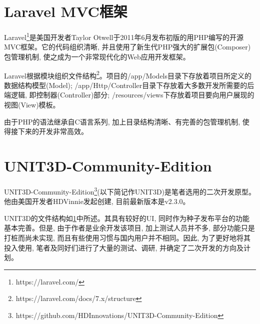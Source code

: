 \section{Laravel MVC框架}
\label{sec:Larvel}

Laravel\footnote{https://laravel.com/}是美国开发者Taylor Otwell于2011年6月发布初版的用PHP编写的开源MVC框架。它的代码组织清晰, 并且使用了新生代PHP强大的扩展包(Composer)包管理机制, 使之成为一个非常现代化的Web应用开发框架。

Laravel根据模块组织文件结构\footnote{https://laravel.com/docs/7.x/structure}。项目的/app/Models目录下存放着项目所定义的数据结构模型(Model); /app/Http/Controller目录下存放着大多数开发所需要的后端逻辑, 即控制器(Controller)部分; /resources/views下存放着项目要向用户展现的视图(View)模板。

由于PHP的语法继承自C语言系列, 加上目录结构清晰、有完善的包管理机制, 使得接下来的开发非常高效。


\section{UNIT3D-Community-Edition}

UNIT3D-Community-Edition\footnote{https://github.com/HDInnovations/UNIT3D-Community-Edition}(以下简记作UNIT3D)是笔者选用的二次开发原型。他由美国开发者HDVinnie发起创建, 目前最新版本是v2.3.0。

UNIT3D的文件结构如\ref{sec:Larvel}中所述。其具有较好的UI, 同时作为种子发布平台的功能基本完善。但是, 由于作者是业余开发该项目, 加上测试人员并不多, 部分功能只是打桩而尚未实现, 而且有些使用习惯与国内用户并不相同。因此, 为了更好地将其投入使用, 笔者及同好们进行了大量的测试、调研, 并确定了二次开发的方向及计划。







